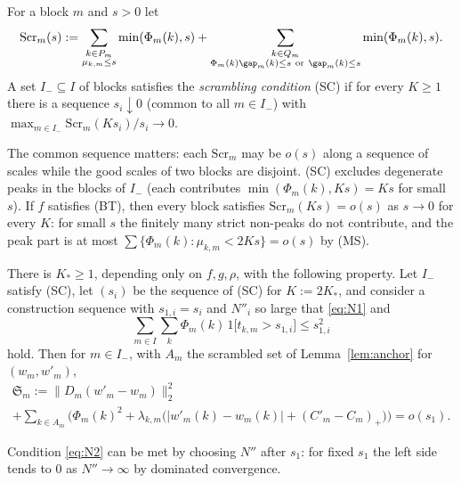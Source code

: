 \begin{definition}\label{def:SC}
For a block $m$ and $s>0$ let
\[
 \mathrm{Scr}_m(s):=\sum_{\substack{k\in P_m\\ \mu_{k,m}\le s}}
 \min(\Phi_m(k),s)+\sum_{\substack{k\in Q_m\\ \Phi_m(k)\gap_m(k)\le s\ \text{or}
 \ \gap_m(k)\le s}}\min(\Phi_m(k),s).
\]
A set $I_-\subseteq I$ of blocks satisfies the \emph{scrambling condition}
\textup{(SC)} if for every $K\ge1$ there is a sequence $s_i\downarrow0$
\textup{(}common to all $m\in I_-$\textup{)} with
$\max_{m\in I_-}\mathrm{Scr}_m(Ks_i)/s_i\to0$.
\end{definition}

The common sequence matters: each $\mathrm{Scr}_m$ may be $o(s)$ along a
sequence of scales while the good scales of two blocks are disjoint.
\textup{(SC)} excludes degenerate peaks in the blocks of $I_-$ (each
contributes $\min(\Phi_m(k),Ks)=Ks$ for small $s$).  If $f$ satisfies
\textup{(BT)}, then every block satisfies $\mathrm{Scr}_m(Ks)=o(s)$ as
$s\to0$ for every $K$: for small $s$ the finitely many strict non-peaks do not
contribute, and the peak part is at most
$\sum\{\Phi_m(k):\mu_{k,m}<2Ks\}=o(s)$ by \textup{(MS)}.

\begin{lemma}\label{lem:scrambling}
There is $K_*\ge1$, depending only on $f,g,\rho$, with the following
property.  Let $I_-$ satisfy \textup{(SC)}, let $(s_i)$ be the sequence of
\textup{(SC)} for $K:=2K_*$, and consider a construction sequence with
$s_{1,i}=s_i$ and $N''_i$ so large that \eqref{eq:N1} and
\begin{equation}\label{eq:N2}
 \sum_{m\in I}\sum_k\Phi_m(k)\,1\big[t_{k,m}>s_{1,i}\big]\le s_{1,i}^2
\end{equation}
hold.  Then for $m\in I_-$, with $A_m$ the scrambled set of
Lemma~\ref{lem:anchor} for $(w_m,w'_m)$,
\begin{multline*}
 \mathfrak S_m:=\|D_m(w'_m-w_m)\|_2^2\\
 +\sum_{k\in A_m}\Big(\Phi_m(k)^2+
 \lambda_{k,m}\big(|w'_m(k)-w_m(k)|+(C'_m-C_m)_+\big)\Big)=o(s_1).
\end{multline*}
\end{lemma}

Condition \eqref{eq:N2} can be met by choosing $N''$ after $s_1$: for fixed
$s_1$ the left side tends to $0$ as $N''\to\infty$ by dominated convergence.

